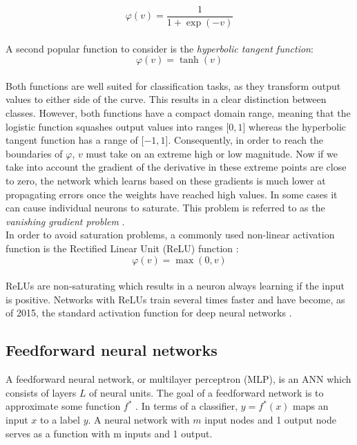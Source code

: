 \begin{equation}
 \varphi(v) = \frac{1}{1 + \exp(-v)} 
\end{equation}
\\
A second popular function to consider is the \textit{hyperbolic tangent function}:\\

\begin{equation}
  \varphi(v) = \tanh(v)
\end{equation}
\\

Both functions are well suited for classification tasks, as they transform output values to either side of the curve. This results in a clear distinction between classes. However, both functions have a compact domain range, meaning that the logistic function squashes output values into ranges $\lbrack0, 1\rbrack$ whereas the hyperbolic tangent function has a range of $\lbrack-1,1\rbrack$. Consequently, in order to reach the boundaries of $\varphi$, $v$ must take on an extreme high or low magnitude. Now if we take into account the gradient of the derivative in these extreme points are close to zero, the network which learns based on these gradients is much lower at propagating errors once the weights have reached high values. In some cases it can cause individual neurons to saturate. This problem is referred to as the \textit{vanishing gradient problem} \cite{Nair:2010:RLU:3104322.3104425}.\\

In order to avoid saturation problems, a commonly used non-linear activation function is the Rectified Linear Unit (ReLU) function \cite{Nair:2010:RLU:3104322.3104425}:\\

\begin{equation}
  \varphi(v) = \max(0, v)
\end{equation}
\\
ReLUs are non-saturating which results in a neuron always learning if the input is positive. Networks with ReLUs train several times faster and have become, as of 2015, the standard activation function for deep neural networks \cite{lecun2015deep}.

\subsection{Feedforward neural networks}
A feedforward neural network, or multilayer perceptron (MLP), is an ANN which consists of layers $L$ of neural units. The goal of a feedforward network is to approximate some function $f^*$ \cite{Goodfellow-et-al-2016}. In terms of a classifier, $y=f^*(x)$ maps an input $x$ to a label $y$. A neural network with $m$ input nodes and 1 output node serves as a function with m inputs and 1 output.

